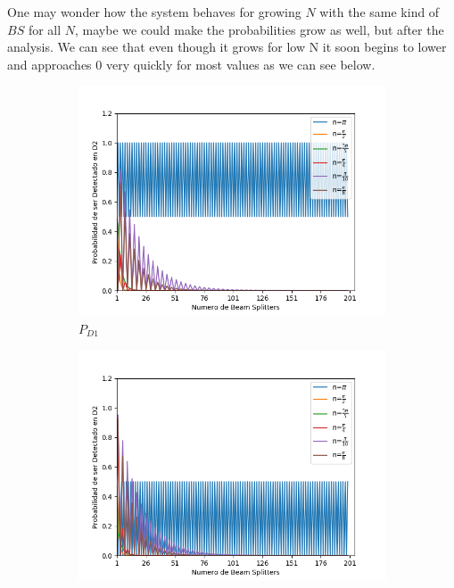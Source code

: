 \documentclass[12pt]{article}
\begin{document}
One may wonder how the system behaves for growing $N$ with the same kind of $BS$ for all $N$, maybe we could make the probabilities grow as well, but after the analysis. We can see that even though it grows for low N it soon begins to lower and approaches 0 very quickly for most values as we can see below. 




\begin{figure}[!htb]
\centering
\begin{subfigure}[b]{0.45\linewidth}
\includegraphics[width=\linewidth]{images/BsFijo_azumaD1.png}
\caption{$P_{D1}$}
\label{fig:BS1}
\end{subfigure}
\begin{subfigure}[b]{0.45\linewidth}
\includegraphics[width=\linewidth]{images/BsFijo_azumaD2.png}

\end{subfigure}
\end{figure}
\end{document}
